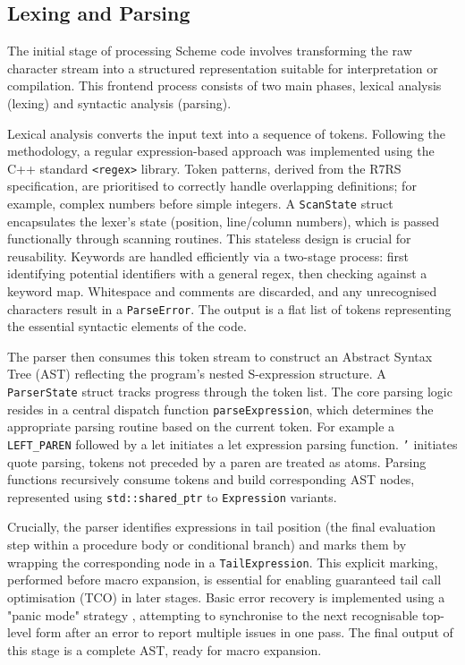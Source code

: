 \documentclass[final]{cmpreport_02}
\begin{document}
\subsection{Lexing and Parsing}
The initial stage of processing Scheme code involves transforming the raw character stream into a structured representation suitable for interpretation or compilation. This frontend process consists of two main phases, lexical analysis (lexing) and syntactic analysis (parsing).\newline

Lexical analysis converts the input text into a sequence of tokens. Following the methodology, a regular expression-based approach was implemented using the C++ standard \texttt{<regex>} library. Token patterns, derived from the R7RS specification, are prioritised to correctly handle overlapping definitions; for example, complex numbers before simple integers. A \texttt{ScanState} struct encapsulates the lexer's state (position, line/column numbers), which is passed functionally through scanning routines. This stateless design is crucial for reusability. Keywords are handled efficiently via a two-stage process: first identifying potential identifiers with a general regex, then checking against a keyword map. Whitespace and comments are discarded, and any unrecognised characters result in a \texttt{ParseError}. The output is a flat list of tokens representing the essential syntactic elements of the code.

The parser then consumes this token stream to construct an Abstract Syntax Tree (AST) reflecting the program's nested S-expression structure. A \texttt{ParserState} struct tracks progress through the token list. The core parsing logic resides in a central dispatch function \texttt{parseExpression}, which determines the appropriate parsing routine based on the current token. For example a \texttt{LEFT\_PAREN} followed by a let initiates a let expression parsing function. \texttt{'} initiates quote parsing, tokens not preceded by a paren are treated as atoms. Parsing functions recursively consume tokens and build corresponding AST nodes, represented using \texttt{std::shared\_ptr} to \texttt{Expression} variants.\newline

Crucially, the parser identifies expressions in tail position (the final evaluation step within a procedure body or conditional branch) and marks them by wrapping the corresponding node in a \texttt{TailExpression}. This explicit marking, performed before macro expansion, is essential for enabling guaranteed tail call optimisation (TCO) in later stages. Basic error recovery is implemented using a "panic mode" strategy \cite{nystrom2021crafting}, attempting to synchronise to the next recognisable top-level form after an error to report multiple issues in one pass. The final output of this stage is a complete AST, ready for macro expansion. 
\end{document}
